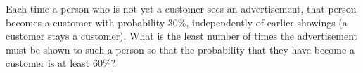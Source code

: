 Each time a person who is not yet a customer sees an advertisement, that person becomes a customer with probability $30\%$, independently of earlier showings (a customer stays a customer). What is the least number of times the advertisement must be shown to such a person so that the probability that they have become a customer is at least $60\%$?
